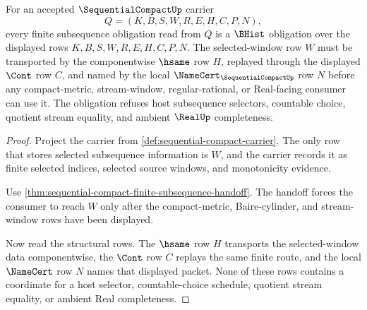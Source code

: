 \begin{theorem}
\label{thm:sequentialcompact-finite-subsequence-obligation}
For an accepted $\SequentialCompactUp$ carrier
$$
Q=(K,B,S,W,R,E,H,C,P,N),
$$
every finite subsequence obligation read from $Q$ is a $\BHist$ obligation over the displayed rows $K,B,S,W,R,E,H,C,P,N$. The selected-window row $W$ must be transported by the componentwise $\hsame$ row $H$, replayed through the displayed $\Cont$ row $C$, and named by the local $\NameCert_{\SequentialCompactUp}$ row $N$ before any compact-metric, stream-window, regular-rational, or Real-facing consumer can use it. The obligation refuses host subsequence selectors, countable choice, quotient stream equality, and ambient $\RealUp$ completeness.
\end{theorem}
\begin{proof}
Project the carrier from \autoref{def:sequential-compact-carrier}. The only row that stores selected subsequence information is $W$, and the carrier records it as finite selected indices, selected source windows, and monotonicity evidence.

Use \autoref{thm:sequential-compact-finite-subsequence-handoff}. The handoff forces the consumer to reach $W$ only after the compact-metric, Baire-cylinder, and stream-window rows have been displayed.

Now read the structural rows. The $\hsame$ row $H$ transports the selected-window data componentwise, the $\Cont$ row $C$ replays the same finite route, and the local $\NameCert$ row $N$ names that displayed packet. None of these rows contains a coordinate for a host selector, countable-choice schedule, quotient stream equality, or ambient Real completeness.
\end{proof}


